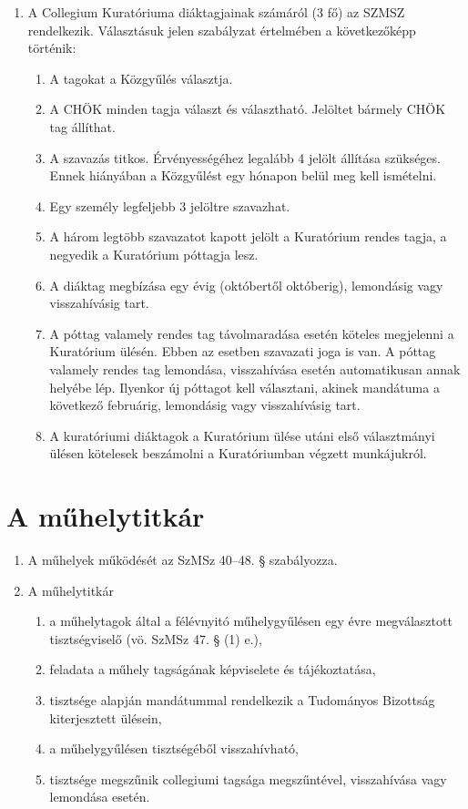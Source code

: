 \documentclass{rulebook}
\begin{document}
\begin{enumerate}
	\item A Collegium Kuratóriuma diáktagjainak számáról (3 fő) az SZMSZ rendelkezik. Választásuk jelen szabályzat értelmében a következőképp történik: 
	\begin{enumerate}
		\item 	A tagokat a Közgyűlés választja.
		\item 	A CHÖK minden tagja választ és választható. Jelöltet bármely CHÖK tag állíthat.
		\item 	A szavazás titkos. Érvényességéhez legalább 4 jelölt állítása szükséges. Ennek hiányában a Közgyűlést egy hónapon belül meg kell ismételni.
		\item 	Egy személy legfeljebb 3 jelöltre szavazhat.
		\item 	A három legtöbb szavazatot kapott jelölt a Kuratórium rendes tagja, a negyedik a Kuratórium póttagja lesz.
		\item 	A diáktag megbízása egy évig (októbertől októberig), lemondásig vagy visszahívásig tart.
		\item 	A póttag valamely rendes tag távolmaradása esetén köteles megjelenni a Kuratórium ülésén. Ebben az esetben szavazati joga is van. A póttag valamely rendes tag lemondása, visszahívása esetén automatikusan annak helyébe lép. Ilyenkor új póttagot kell választani, akinek mandátuma a következő februárig, lemondásig vagy visszahívásig tart.
		\item 	A kuratóriumi diáktagok a Kuratórium ülése utáni első választmányi ülésen kötelesek beszámolni a Kuratóriumban végzett munkájukról.
	\end{enumerate}
\end{enumerate}


\section{A műhelytitkár}

\begin{enumerate}
	\item A műhelyek működését az SzMSz 40–48. § szabályozza.
	\item A műhelytitkár
	\begin{enumerate}
		\item a műhelytagok által a félévnyitó műhelygyűlésen egy évre megválasztott tisztségviselő (vö. SzMSz 47. § (1) e.),
		\item feladata a műhely tagságának képviselete és tájékoztatása,
		\item tisztsége alapján mandátummal rendelkezik a Tudományos Bizottság kiterjesztett ülésein,
		\item a műhelygyűlésen tisztségéből visszahívható,
		\item tisztsége megszűnik collegiumi tagsága megszűntével, visszahívása vagy lemondása esetén.
	\end{enumerate}
\end{enumerate}
\end{document}
